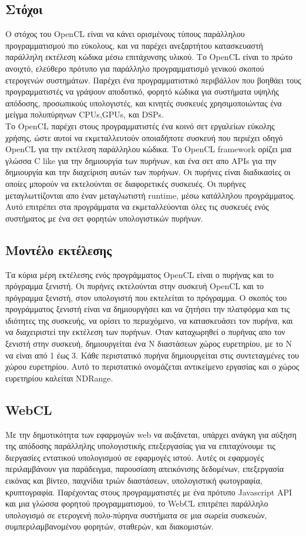 \subsection{Στόχοι}
Ο στόχος του OpenCL είναι να κάνει ορισμένους τύπους παράλληλου προγραμματισμού πιο εύκολους, και να παρέχει ανεξαρτήτου κατασκευαστή παράλληλη εκτέλεση κώδικα μέσω επιτάχυνσης υλικού. Το OpenCL είναι το πρώτο ανοιχτό, ελεύθερο πρότυπο για παράλληλο προγραμματισμό γενικού σκοπού ετερογενών συστημάτων. Παρέχει ένα προγραμματιστικό περιβάλλον που βοηθάει τους προγραμματιστές να γράψουν αποδοτικό, φορητό κώδικα για συστήματα υψηλής απόδοσης, προσωπικούς υπολογιστές, και κινητές συσκευές χρησιμοποιώντας ένα μείγμα πολυπύρηνων CPUs,GPUs, και DSPs.\\
Το OpenCL παρέχει στους προγραμματιστές ένα κοινό σετ εργαλείων εύκολης χρήσης, ώστε αυτοί να εκμεταλλευτούν οποιαδήποτε συσκευή που περιέχει οδηγό OpenCL για την εκτέλεση παράλληλου κώδικα. Το OpenCL framework ορίζει μια γλώσσα C like για την δημιουργία των πυρήνων, και ένα σετ απο APIs για την δημιουργία και την διαχείριση αυτών των πυρήνων. Οι πυρήνες είναι διαδικασίες οι οποίες μπορούν να εκτελούνται σε διαφορετικές συσκευές. Οι πυρήνες μεταγλωττίζονται απο έναν μεταγλωτιστή runtime, μέσω κατάλληλου προγράμματος. Αυτό επιτρέπει στα προγράμματα να εκμεταλλεύονται όλες τις συσκευές ενός συστήματος με ένα σετ φορητών υπολογιστικών πυρήνων.
\subsection{Μοντέλο εκτέλεσης}
Τα κύρια μέρη εκτέλεσης ενός προγράμματος OpenCL είναι ο πυρήνας και το πρόγραμμα ξενιστή. Οι πυρήνες εκτελούνται στην συσκευή OpenCL και το πρόγραμμα ξενιστή, στον υπολογιστή που εκτελείται το πρόγραμμα. Ο σκοπός του προγράμματος ξενιστή είναι να δημιουργήσει και να ζητήσει την πλατφόρμα και τις ιδιότητες της συσκευής, να ορίσει το περιεχόμενο, να κατασκευάσει τον πυρήνα, και να διαχειριστεί την εκτέλεση των πυρήνων. Όταν καταχωρηθεί ο πυρήνας απο τον ξενιστή στην συσκευή, δημιουργείται ένα Ν διαστάσεων χώρος ευρετηρίου, με το Ν να είναι από 1 έως 3. Κάθε περιστατικό πυρήνα δημιουργείται στις συντεταγμένες του χώρου ευρετηρίου. Αυτό το περιστατικό ονομάζεται αντικείμενο εργασίας και ο χώρος ευρετηρίου καλείται NDRange.

\subsection{WebCL}
Με την δημοτικότητα των εφαρμογών web να αυξάνεται, υπάρχει ανάγκη για αύξηση της απόδοσης παράλληλης υπολογιστικής επεξεργασίας για να επιταχύνουμε τις διεργασίες εντατικού υπολογισμού σε εφαρμογές ιστού. Αυτές οι εφαρμογές περιλαμβάνουν για παράδειγμα, παρουσίαση απεικόνισης δεδομένων, επεξεργασία εικόνας και βίντεο, παιχνίδια τριών διαστάσεων, υπολογιστική φωτογραφία, κρυπτογραφία. Παρέχοντας στους προγραμματιστές με ένα πρότυπο Javascript API και μια γλώσσα φορητού προγραμματισμού, το WebCL επιτρέπει παράλληλο υπολογισμό σε ετερογενή πολυ-πύρηνα συστήματα σε μια σωρεία συσκευών, συμπεριλαμβανομένου φορητών, σταθερών, και διακομιστών. 

